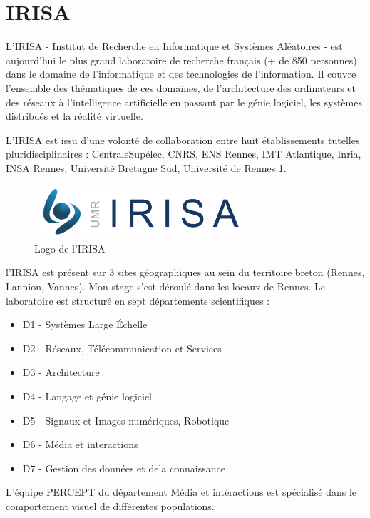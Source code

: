 \chapter{IRISA}

\par
L'IRISA - Institut de Recherche en Informatique et Systèmes Aléatoires - est
aujourd'hui le plus grand laboratoire de recherche français (+ de 850 personnes)
dans le domaine de l'informatique et des technologies de l'information. Il
couvre l'ensemble des thématiques de ces domaines, de l'architecture des
ordinateurs et des réseaux à l'intelligence artificielle en passant par le génie
logiciel, les systèmes distribués et la réalité virtuelle.

\par
L'IRISA est issu d'une volonté de collaboration entre huit établissements tutelles pluridisciplinaires : CentraleSupélec, CNRS, ENS Rennes, IMT Atlantique, Inria, INSA Rennes, Université Bretagne Sud, Université de Rennes 1.

\begin{figure}[h]
    \centering
    \includegraphics[width = 0.7\textwidth]{datas/logo_irisa.jpg}
    \caption{Logo de l'IRISA}
\end{figure}

\par
l'IRISA est présent sur 3 sites géographiques au sein du territoire breton (Rennes, Lannion, Vannes). Mon stage s'est déroulé dans les locaux de Rennes.
Le laboratoire est structuré en sept départements scientifiques :
\begin{itemize}
    \item D1 - Systèmes Large Échelle
    \item D2 - Réseaux, Télécommunication et Services
    \item D3 - Architecture
    \item D4 - Langage et génie logiciel
    \item D5 - Signaux et Images numériques, Robotique
    \item D6 - Média et interactions
    \item D7 - Gestion des données et dela connaissance
\end{itemize}


\par
L'équipe PERCEPT du département Média et intéractions est spécialisé dans le comportement visuel de différentes populations.